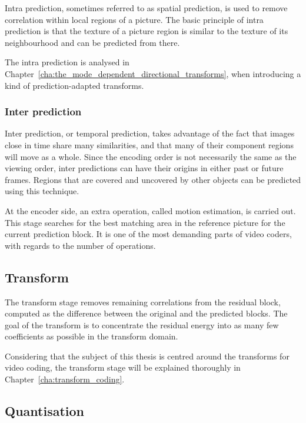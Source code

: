 \documentclass[11pt,a4paper,openright,twoside]{book}
\numberwithin{equation}{section} %
\begin{document}
Intra prediction, sometimes referred to as spatial prediction, is used
to remove correlation within local regions of a picture.
The basic principle of intra prediction is that the texture of a picture
region is similar to the texture of its neighbourhood and can be
predicted from there.

The intra prediction is analysed in
Chapter~\ref{cha:the_mode_dependent_directional_transforms}, when
introducing a kind of prediction-adapted transforms.

\subsubsection{Inter prediction}
\label{ssub:inter_prediction}

Inter prediction, or temporal prediction, takes advantage of the fact
that images close in time share many similarities, and that many of
their component regions will move as a whole.
Since the encoding order is not necessarily the same as the viewing
order, inter predictions can have their origins in either past or future
frames.
Regions that are covered and uncovered by other objects can be predicted
using this technique.

At the encoder side, an extra operation, called motion estimation, is
carried out.
This stage searches for the best matching area in the reference picture
for the current prediction block.
It is one of the most demanding parts of video coders, with regards to
the number of operations.

\subsection{Transform}
\label{sub:transform}

The transform stage removes remaining correlations from the residual
block, computed as the difference between the original and the predicted
blocks.
The goal of the transform is to concentrate the residual energy into as
many few coefficients as possible in the transform domain.

Considering that the subject of this thesis is centred around the
transforms for video coding, the transform stage will be explained
thoroughly in Chapter~\ref{cha:transform_coding}.

\subsection{Quantisation}
\label{sub:quantisation}
\end{document}
